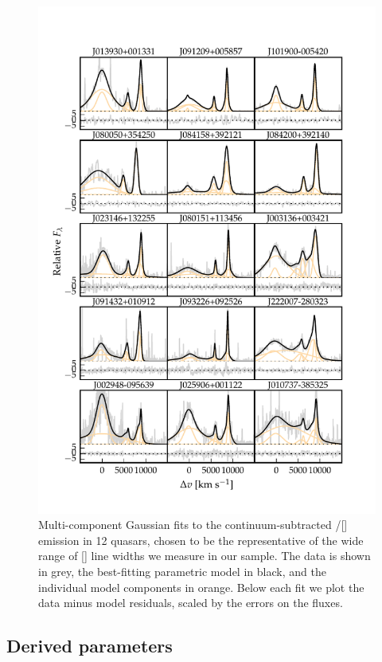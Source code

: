 \begin{figure}
    \includegraphics[width=\textwidth]{figures/chapter04/example_spectrum_grid.pdf} 
    \caption{Multi-component Gaussian fits to the continuum-subtracted \hbns/[] emission in 12 quasars, chosen to be the representative of the wide range of [] line widths we measure in our sample. The data is shown in grey, the best-fitting parametric model in black, and the individual model components in orange. Below each fit we plot the data minus model residuals, scaled by the errors on the fluxes.}     
    \label{fig:example_spectrum_grid}
\end{figure}


\subsection{Derived parameters}


